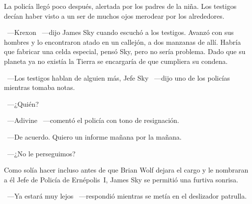 La policía llegó poco después, alertada por los padres de la niña. Los testigos decían haber visto a un ser de muchos ojos merodear por los alrededores.

~---Krexon ~---dijo James Sky cuando escuchó a los testigos. Avanzó con sus hombres y lo encontraron atado en un callejón, a dos manzanas de allí. Habría que fabricar una celda especial, pensó Sky, pero no sería problema. Dado que su planeta ya no existía la Tierra se encargaría de que cumpliera su condena.

~---Los testigos hablan de alguien más, Jefe Sky ~---dijo uno de los policías mientras tomaba notas.

~---¿Quién?

~---Adivine ~---comentó el policía con tono de resignación.

~---De acuerdo. Quiero un informe mañana por la mañana.

~---¿No le perseguimos?

Como solía hacer incluso antes de que Brian Wolf dejara el cargo y le nombraran a él Jefe de Policía de Ernépolis~I, James Sky se permitió una furtiva sonrisa.

~---Ya estará muy lejos ~---respondió mientras se metía en el deslizador patrulla.

\endinput
